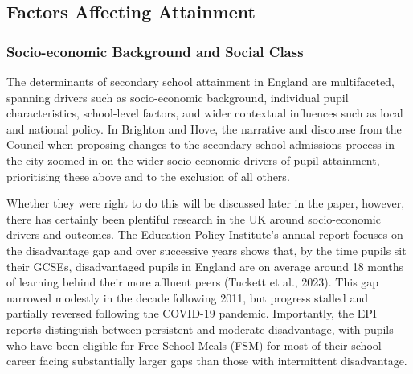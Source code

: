 \documentclass[
  11pt,
]{article}
\begin{document}
\subsection{Factors Affecting
Attainment}\label{factors-affecting-attainment}

\subsubsection{Socio-economic Background and Social
Class}\label{socio-economic-background-and-social-class}

The determinants of secondary school attainment in England are
multifaceted, spanning drivers such as socio-economic background,
individual pupil characteristics, school-level factors, and wider
contextual influences such as local and national policy. In Brighton and
Hove, the narrative and discourse from the Council when proposing
changes to the secondary school admissions process in the city zoomed in
on the wider socio-economic drivers of pupil attainment, prioritising
these above and to the exclusion of all others.

Whether they were right to do this will be discussed later in the paper,
however, there has certainly been plentiful research in the UK around
socio-economic drivers and outcomes. The Education Policy Institute's
annual report focuses on the disadvantage gap and over successive years
shows that, by the time pupils sit their GCSEs, disadvantaged pupils in
England are on average around 18 months of learning behind their more
affluent peers (Tuckett et al., 2023). This gap narrowed modestly in the
decade following 2011, but progress stalled and partially reversed
following the COVID-19 pandemic. Importantly, the EPI reports
distinguish between persistent and moderate disadvantage, with pupils
who have been eligible for Free School Meals (FSM) for most of their
school career facing substantially larger gaps than those with
intermittent disadvantage.
\end{document}
